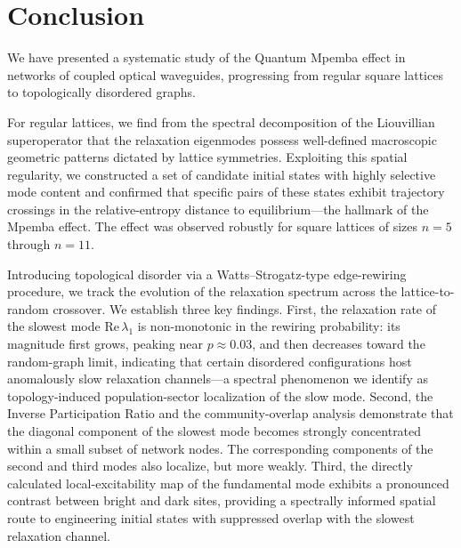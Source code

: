 \documentclass[pdflatex,sn-mathphys-num]{sn-jnl}
\let\origtextcolor\textcolor
\newcommand{\rev}[1]{{\origtextcolor{revred}{#1}}}
\renewcommand{\textcolor}[2]{#2}
\begin{document}


\section{Conclusion}

We have presented a systematic study of the Quantum Mpemba effect
in networks of coupled optical waveguides, progressing from regular
square lattices to topologically disordered graphs.

For regular lattices, we find from the spectral decomposition of the
Liouvillian superoperator that the relaxation eigenmodes possess
well-defined macroscopic geometric patterns dictated by lattice
symmetries. Exploiting this spatial regularity, we constructed a set
of candidate initial states with highly selective mode content and
confirmed that specific pairs of these states exhibit trajectory
crossings in the relative-entropy distance to equilibrium---the
hallmark of the Mpemba effect. The effect was observed robustly for
square lattices of sizes $n = 5$ through $n = 11$.

Introducing topological disorder via a Watts--Strogatz-type
edge-rewiring procedure, we track the evolution of the relaxation
spectrum across the lattice-to-random crossover. We establish three
key findings. First, the relaxation rate of the slowest mode
$\mathrm{Re}\,\lambda_1$ \rev{is non-monotonic in the rewiring
probability: its magnitude first grows, peaking near $p \approx 0.03$,
and then decreases toward the random-graph limit}, indicating that certain disordered configurations
host anomalously slow relaxation channels---a spectral phenomenon we identify as topology-induced population-sector localization of the slow mode. Second, the Inverse Participation
Ratio and the community-overlap analysis demonstrate that the diagonal component of the slowest
mode becomes strongly concentrated within a small subset of network nodes. The corresponding
components of the second and third modes also localize, but more weakly. Third, the directly
calculated local-excitability map of the fundamental mode exhibits a pronounced contrast between
bright and dark sites, providing a spectrally informed spatial route to engineering initial states with
suppressed overlap with the slowest relaxation channel.
\end{document}
